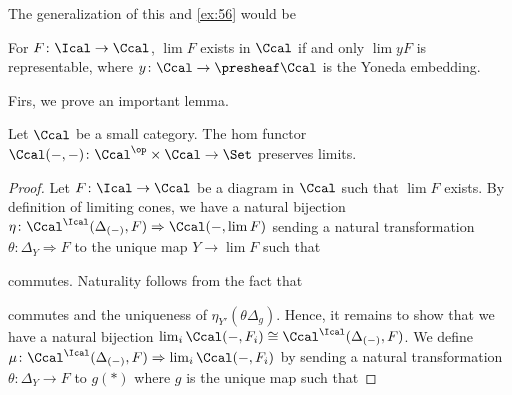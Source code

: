 \begin{solution}
    The generalization of this and \ref{ex:56} would be
    \begin{proposition}\label{prop:rep-lim}
        For $F\colon\Ical\to\Ccal$, $\lim F$ exists in $\Ccal$ if and only $\lim yF$ is representable, where $y\colon\Ccal\to\presheaf\Ccal$ is the Yoneda embedding.
    \end{proposition}
    Firs, we prove an important lemma.
    \begin{lemma}\label{lemma:hom-prev-lim}
        Let $\Ccal$ be a small category. The hom functor $\Ccal(-,-)\colon\Ccal^\op\times\Ccal\to\Set$ preserves limits.
    \end{lemma}
    \begin{proof}
        Let $F\colon\Ical\to\Ccal$ be a diagram in $\Ccal$ such that $\lim F$ exists.
        By definition of limiting cones, we have a natural bijection $\eta\colon\Ccal^\Ical(\Delta_{(-)},F)\Rightarrow \Ccal(-,\lim F)$
        sending a natural transformation $\theta\colon\Delta_Y\Rightarrow F$ to the unique map $Y\to\lim F$ such that
        commutes.
        Naturality follows from the fact that
        \begin{center}
        \end{center}
        commutes and the uniqueness of $\eta_{Y'}(\theta\Delta_g)$. 
        Hence, it remains to show that we have a natural bijection $\lim_i\Ccal(-, F_i)\cong \Ccal^\Ical(\Delta_{(-)}, F)$.
        We define $\mu\colon\Ccal^\Ical(\Delta_{(-)}, F)\Rightarrow\lim_i\Ccal(-,F_i)$ by sending a natural transformation $\theta\colon\Delta_Y\to F$ to $g(*)$ where $g$ is the unique map such that

\end{proof}
\end{solution}
